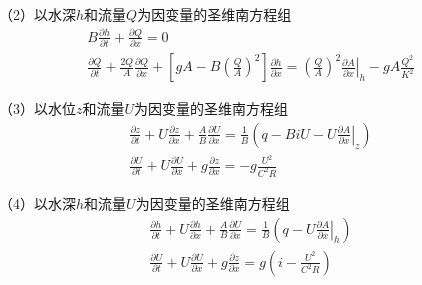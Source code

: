 （2）以水深$h$和流量$Q$为因变量的圣维南方程组
\begin{equation}
  \begin{gathered}
    B\frac{\partial h}{\partial t}
    +
    \frac{\partial Q}{\partial x}
    =
    0
    \\
    \frac{\partial Q}{\partial t}
    +
    \frac{2Q}{A}\frac{\partial Q}{\partial x}
    +
    \left[
      gA -
      B
      \left(
      \frac{Q}{A}
      \right)^{2}
    \right]
    \frac{\partial h}{\partial x}
    =
    \left(
    \frac{Q}{A}
    \right)^{2}
    \left.
    \frac{\partial A}{\partial x}
    \right|_{h}
    -
    gA\frac{Q^{2}}{K^{2}}
  \end{gathered}
  \label{EqCGe_SV_hQ}
\end{equation}



（3）以水位$z$和流量$U$为因变量的圣维南方程组
\begin{equation}
  \begin{gathered}
    \frac{\partial z}{\partial t}
    +
    U\frac{\partial z}{\partial x}
    +
    \frac{A}{B}\frac{\partial U}{\partial x}
    =
    \frac{1}{B}
    \left(
    q - BiU - U\left.\frac{\partial A}{\partial x}\right|_{z}
    \right)
    \\
    \frac{\partial U}{\partial t}
    +
    U\frac{\partial U}{\partial x}
    +
    g\frac{\partial z}{\partial x}
    =
    -g\frac{U^{2}}{C^{2}R}
  \end{gathered}
  \label{EqCGe_SV_zU}
\end{equation}

（4）以水深$h$和流量$U$为因变量的圣维南方程组
\begin{equation}
  \begin{gathered}
    \frac{\partial h}{\partial t}
    +
    U\frac{\partial h}{\partial x}
    +
    \frac{A}{B}\frac{\partial U}{\partial x}
    =
    \frac{1}{B}
    \left(
    q - U\left.\frac{\partial A}{\partial x}\right|_{h}
    \right)
    \\
    \frac{\partial U}{\partial t}
    +
    U\frac{\partial U}{\partial x}
    +
    g\frac{\partial z}{\partial x}
    =
    g
    \left(
    i-\frac{U^{2}}{C^{2}R}
    \right)
  \end{gathered}
  \label{EqCGe_SV_hU}
\end{equation}

